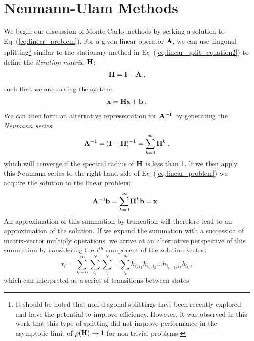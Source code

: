 \section{Neumann-Ulam Methods}
\label{sec:mc_preliminaries}
We begin our discussion of Monte Carlo methods by seeking a solution
to Eq~(\ref{eq:linear_problem}). For a given linear operator $\mathbf{A}$,
we can use diagonal splitting\footnote{It should be noted that
  non-diagonal splittings have been recently explored
  \cite{srinivasan_monte_2010} and have the potential to improve
  efficiency. However, it was observed in this work that this type of
  splitting did not improve performance in the asymptotic limit of
  $\rho(\mathbf{H}) \rightarrow 1$ for non-trivial problems.} similar to
the stationary method in Eq~(\ref{eq:linear_split_equation2}) to
define the \textit{iteration matrix}, $\mathbf{H}$:
\begin{equation}
  \mathbf{H} = \mathbf{I} - \mathbf{A}\:,
  \label{eq:linear_mc_iteration_matrix}
\end{equation}
such that we are solving the system:
\begin{equation}
  \mathbf{x} = \mathbf{H} \mathbf{x} + \mathbf{b}\:.
  \label{eq:richardson_split}
\end{equation}
We can then form an alternative representation for $\mathbf{A}^{-1}$ by
generating the \textit{Neumann series}:
\begin{equation}
  \mathbf{A}^{-1} = (\mathbf{I}-\mathbf{H})^{-1} = \sum_{k=0}^{\infty} \mathbf{H}^k\:,
  \label{eq:neumann_series}
\end{equation}
which will converge if the spectral radius of $\mathbf{H}$ is less than
1. If we then apply this Neumann series to the right hand side of
Eq~(\ref{eq:linear_problem}) we acquire the solution to the linear
problem:
\begin{equation}
  \mathbf{A}^{-1}\mathbf{b} = \sum_{k=0}^{\infty} \mathbf{H}^k\mathbf{b} = \mathbf{x}\:.
  \label{eq:neumann_solution}
\end{equation}
An approximation of this summation by truncation will therefore lead
to an approximation of the solution. If we expand the summation with a
succession of matrix-vector multiply operations, we arrive at an
alternative perspective of this summation by considering the $i^{th}$
component of the solution vector:
\begin{equation}
  x_i = \sum_{k=0}^{\infty}\sum_{i_1}^{N}\sum_{i_2}^{N}\ldots
  \sum_{i_k}^{N}h_{i,i_1}h_{i_1,i_2}\ldots h_{i_{k-1},i_k}b_{i_k}\:,
  \label{eq:expanded_neumann_solution}
\end{equation}
which can interpreted as a series of transitions between states,
